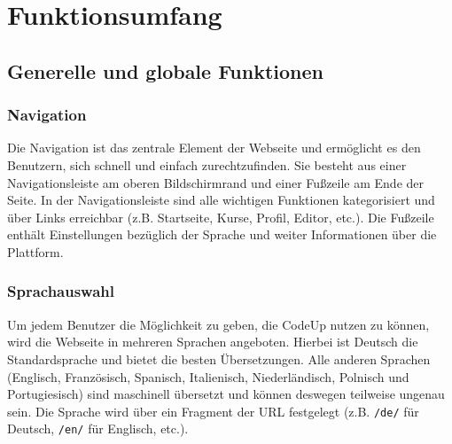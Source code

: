 \documentclass{subfiles}
\begin{document}
\section{Funktionsumfang}\label{sec:website-features}

\subsection{Generelle und globale Funktionen}

\subsubsection{Navigation}
Die Navigation ist das zentrale Element der Webseite und ermöglicht es den Benutzern, sich schnell und einfach zurechtzufinden.
Sie besteht aus einer Navigationsleiste am oberen Bildschirmrand und einer Fußzeile am Ende der Seite.
In der Navigationsleiste sind alle wichtigen Funktionen kategorisiert und über Links erreichbar (z.B. Startseite, Kurse, Profil, Editor, etc.).
Die Fußzeile enthält Einstellungen bezüglich der Sprache und weiter Informationen über die Plattform.

\subsubsection{Sprachauswahl}
Um jedem Benutzer die Möglichkeit zu geben, die CodeUp nutzen zu können, wird die Webseite in mehreren Sprachen angeboten.
Hierbei ist Deutsch die Standardsprache und bietet die besten Übersetzungen.
Alle anderen Sprachen (Englisch, Französisch, Spanisch, Italienisch, Niederländisch, Polnisch und Portugiesisch) sind maschinell übersetzt und können deswegen teilweise ungenau sein.
Die Sprache wird über ein Fragment der URL festgelegt (z.B. \texttt{\dq /de/\dq} für Deutsch, \texttt{\dq /en/\dq} für Englisch, etc.).
\end{document}
